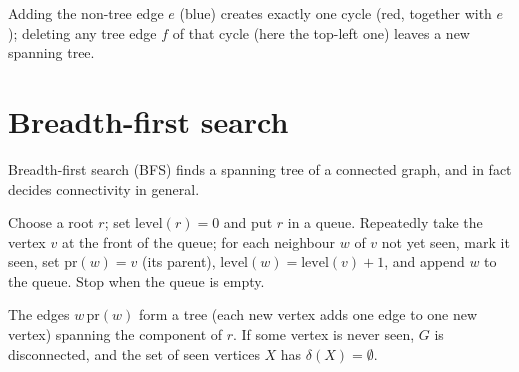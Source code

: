 \begin{center}
\end{center}
Adding the non-tree edge $e$ (blue) creates exactly one cycle (red, together with $e$);
deleting any tree edge $f$ of that cycle (here the top-left one) leaves a new spanning tree.

\section{Breadth-first search}

Breadth-first search (BFS) finds a spanning tree of a connected graph, and in fact decides
connectivity in general.

\begin{important}[BFS]
Choose a root $r$; set $\mathrm{level}(r) = 0$ and put $r$ in a queue. Repeatedly take the
vertex $v$ at the front of the queue; for each neighbour $w$ of $v$ not yet seen, mark it seen,
set $\mathrm{pr}(w) = v$ (its parent), $\mathrm{level}(w) = \mathrm{level}(v) + 1$, and append
$w$ to the queue. Stop when the queue is empty.
\end{important}

The edges $w\,\mathrm{pr}(w)$ form a tree (each new vertex adds one edge to one new vertex)
spanning the component of $r$. If some vertex is never seen, $G$ is disconnected, and the set
of seen vertices $X$ has $\delta(X) = \emptyset$.

